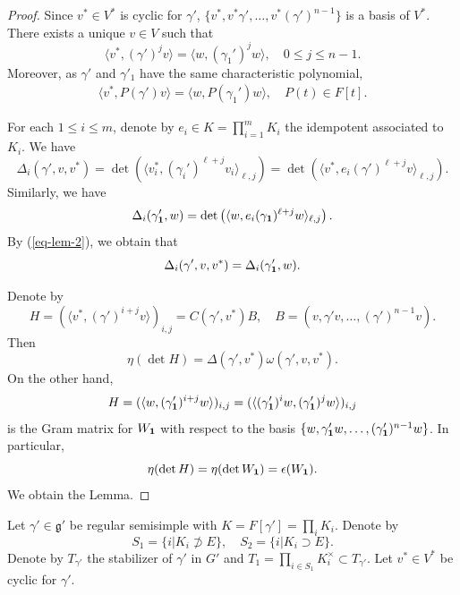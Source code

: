\documentclass[a4paper]{amsart}
\newcommand{\fg}{{\mathfrak{g}}} \newcommand{\fh}{{\mathfrak{h}}}
\theoremstyle{plain}
\theoremstyle{remark} \newtheorem{remark}[thm]{Remark}
\theoremstyle{exercise} \newtheorem{exercise}[thm]{Exercise}
\theoremstyle{example} \newtheorem{example}[thm]{Example}
\theoremstyle{question} \newtheorem{question}[thm]{Question}
\theoremstyle{assumption} \newtheorem{assumption}[thm]{Assumption}
\numberwithin{equation}{section}
\begin{document}
\begin{proof}

Since $v^* \in V^*$ is cyclic for $\gamma'$, 
$\{v^*,v^*\gamma',\ldots,v^*(\gamma')^{n-1}\}$ is a basis of $V^*$. There exists a unique $v \in V$
such that
\[\langle v^*,(\gamma')^jv \rangle = \langle w, (\gamma_1')^jw \rangle, \quad 0 \leq j \leq n-1.\]
Moreover, as $\gamma'$ and $\gamma'_1$ have the same characteristic
polynomial,
\begin{align}\label{eq-lem-2}
\langle v^*,P(\gamma')v \rangle = \langle w, P(\gamma_1')w \rangle, \quad P(t) \in F[t].
\end{align}

For each $1 \leq i \leq m$, denote by $e_i \in K = \prod_{i=1}^m K_i$  the idempotent associated to $K_i$. We have
\[\Delta_i(\gamma',v,v^*) = \det\left( \langle v_i^*, (\gamma_i')^{\ell+j} v_i \rangle_{\ell,j}\right)
= \det\left( \langle v^*, e_i(\gamma')^{\ell+j} v \rangle_{\ell,j}\right).
\]
Similarly, we have
\[\Delta_i(\gamma_{\bf 1}',w) = \det\left( \langle w, e_i(\gamma_{\bf 1})^{\ell+j}w \rangle_{\ell,j}\right).\]
By (\ref{eq-lem-2}), we obtain that
\[\Delta_i(\gamma',v,v^*) = \Delta_i(\gamma_{\bf 1}',w).\]

Denote by
\[H = (\langle v^*, (\gamma')^{i+j} v \rangle)_{i,j} =  C(\gamma',v^*)B, \quad B = (v,\gamma'v,\ldots,(\gamma')^{n-1}v).\]
Then
\[\eta(\det H) = \Delta(\gamma',v^*)\omega(\gamma',v,v^*).\]
On the other hand,
\[H= (\langle w, (\gamma_{\bf 1}')^{i+j} w \rangle)_{i,j} = 
(\langle (\gamma_{\bf 1}')^iw, (\gamma_{\bf 1}')^{j} w \rangle)_{i,j}\]
is the Gram matrix for $W_{\bf 1}$ with respect to the basis
$\{w,\gamma_{\bf 1}'w,\ldots, (\gamma_{\bf 1}')^{n-1}w \}$.
In particular,
\[\eta(\det H) = \eta(\det W_{\bf 1}) = \epsilon(W_{\bf 1}).\]
We obtain the Lemma.



\end{proof}





Let $\gamma' \in \fg'$ be regular semisimple with $K = F[\gamma'] = 
\prod_i K_i$. Denote by 
\[S_1 = \{i | K_i \not\supset E\}, \quad S_2 = \{i | K_i \supset E\}.\]
Denote by $T_{\gamma'}$ the stabilizer of $\gamma'$ in $G'$ and 
$T_1 = \prod_{i \in S_1} K_i^\times \subset T_{\gamma'}$. Let $v^* \in V^*$ be cyclic for $\gamma'$.
\end{document}
